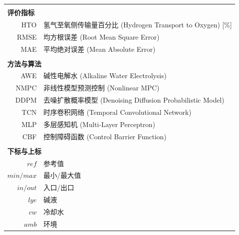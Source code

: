 \begin{nomenclature}
\begin{longtable}{r l}
  \multicolumn{2}{l}{} \\[-0.3em]
  \multicolumn{2}{l}{\textbf{评价指标}} \\[0.3em]
  HTO & 氢气至氧侧传输量百分比 (Hydrogen Transport to Oxygen) [\%] \\
  RMSE & 均方根误差 (Root Mean Square Error) \\
  MAE & 平均绝对误差 (Mean Absolute Error) \\

  \multicolumn{2}{l}{} \\[-0.3em]
  \multicolumn{2}{l}{\textbf{方法与算法}} \\[0.3em]
  AWE & 碱性电解水 (Alkaline Water Electrolysis) \\
  NMPC & 非线性模型预测控制 (Nonlinear MPC) \\
  DDPM & 去噪扩散概率模型 (Denoising Diffusion Probabilistic Model) \\
  TCN & 时序卷积网络 (Temporal Convolutional Network) \\
  MLP & 多层感知机 (Multi-Layer Perceptron) \\
  CBF & 控制障碍函数 (Control Barrier Function) \\

  \multicolumn{2}{l}{} \\[-0.3em]
  \multicolumn{2}{l}{\textbf{下标与上标}} \\[0.3em]
  $ref$ & 参考值 \\
  $min/max$ & 最小/最大值 \\
  $in/out$ & 入口/出口 \\
  $lye$ & 碱液 \\
  $cw$ & 冷却水 \\
  $amb$ & 环境 \\

\end{longtable}

\end{nomenclature}
